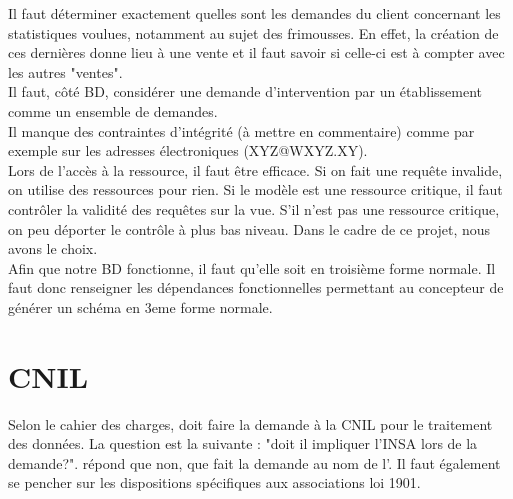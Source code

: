 \documentclass [a4paper] {article}
\begin{document}
Il faut déterminer exactement quelles sont les demandes du client concernant les statistiques voulues, notamment au sujet des frimousses. En effet, la création de ces dernières donne lieu à une vente et il faut savoir si celle-ci est à compter avec les autres "ventes".\\
Il faut, côté BD, considérer une demande d'intervention par un établissement comme un ensemble de demandes.\\
Il manque des contraintes d'intégrité (à mettre en commentaire) comme par exemple sur les adresses électroniques (XYZ@WXYZ.XY).\\
Lors de l'accès à la ressource, il faut être efficace. Si on fait une requête invalide, on utilise des ressources pour rien. Si le modèle est une ressource critique, il faut contrôler la validité des requêtes sur la vue. S'il n'est pas une ressource critique, on peu déporter le contrôle à plus bas niveau. Dans le cadre de ce projet, nous avons le choix.\\
Afin que notre BD fonctionne, il faut qu'elle soit en troisième forme normale. Il faut donc renseigner les dépendances fonctionnelles permettant au concepteur de générer un schéma en 3eme forme normale.


\section{CNIL}
Selon le cahier des charges, \Sergi{} doit faire la demande à la CNIL pour le traitement des données. La question est la suivante : "doit il impliquer l'INSA lors de la demande?". \nomTuteurPedago{} répond que non, que \Sergi{} fait la demande au nom de l'\nomClient{}. Il faut également se pencher sur les dispositions spécifiques aux associations loi 1901.


\newpage
\end{document}
